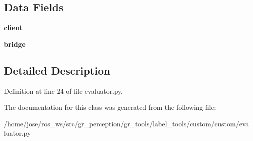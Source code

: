 \subsection*{Data Fields}
\begin{DoxyCompactItemize}
\item 
\mbox{\label{classcustom_1_1evaluator_1_1ImageEvaluator_a95cdb2801785fb4582a319659750f5a9}} 
{\bfseries client}
\item 
\mbox{\label{classcustom_1_1evaluator_1_1ImageEvaluator_a680cb9af706f15b026b271ebbab736b2}} 
{\bfseries bridge}
\end{DoxyCompactItemize}


\subsection{Detailed Description}


Definition at line 24 of file evaluator.\+py.



The documentation for this class was generated from the following file\+:\begin{DoxyCompactItemize}
\item 
/home/jose/ros\+\_\+ws/src/gr\+\_\+perception/gr\+\_\+tools/label\+\_\+tools/custom/custom/evaluator.\+py\end{DoxyCompactItemize}
